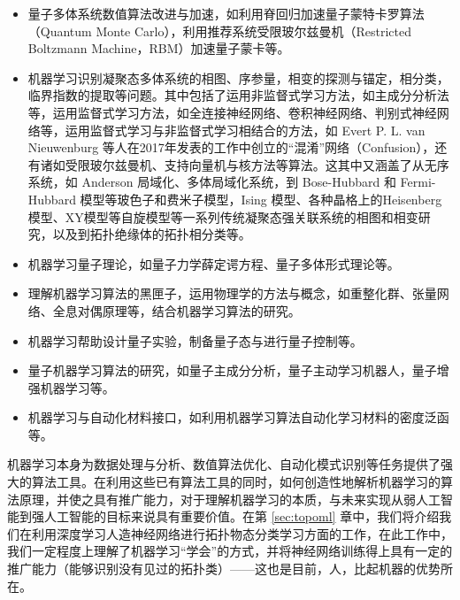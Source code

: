 \begin{itemize}

\item 量子多体系统数值算法改进与加速，如利用脊回归加速量子蒙特卡罗算法（Quantum Monte Carlo）\cite{acmc1,acmc2,acmc3,acmc4}，利用推荐系统受限玻尔兹曼机（Restricted Boltzmann Machine，RBM）加速量子蒙卡\cite{acmcwl1,acmcwl2}等。

\item 机器学习识别凝聚态多体系统的相图、序参量，相变的探测与锚定，相分类，临界指数的提取等问题\cite{ml-anderson-2014,confusion,mlphase2017-nphys,wangleipca2016,wcpca,mlphase2017-prx,jp1,jp2,jp3,jp4,zhangyiml2017,zpf2017,topoml,wanxin-2017,kernel2017,ml-mbl-2017,pca2017a,pca2017b,rbm-2017,unsup-2017,unsup-hubb-2018,discriminative2018,ml-disorder-2018}。其中包括了运用非监督式学习方法\cite{unsup-2017,unsup-hubb-2018}，如主成分分析法\cite{wangleipca2016,wcpca,pca2017a,pca2017b}等，运用监督式学习方法，如全连接神经网络\cite{zhangyiml2017,mlphase2017-prx,ml-mbl-2017}、卷积神经网络\cite{zpf2017,jp1,jp2,jp3,jp4,mlphase2017-nphys,wanxin-2017}、判别式神经网络\cite{discriminative2018}等，运用监督式学习与非监督式学习相结合的方法，如 Evert P. L. van Nieuwenburg 等人在2017年发表的工作\cite{confusion}中创立的“混淆”网络（Confusion），还有诸如受限玻尔兹曼机\cite{rbm-2017}、支持向量机与核方法\cite{kernel2017}等算法。这其中又涵盖了从无序系统\cite{ml-disorder-2018}，如 Anderson 局域化\cite{ml-anderson-2014,jp1,jp2,jp4}、多体局域化\cite{ml-mbl-2017}系统，到 Bose-Hubbard 和 Fermi-Hubbard 模型等玻色子和费米子模型\cite{confusion,rbm-2017,mlphase2017-prx,pca2017b,unsup-hubb-2018}，Ising 模型\cite{jp3,kernel2017,mlphase2017-nphys,wangleipca2016,wcpca,wanxin-2017}、各种晶格上的Heisenberg 模型、XY模型\cite{pca2017a,unsup-2017,wcpca}等自旋模型等一系列传统凝聚态强关联系统的相图和相变研究，以及到拓扑绝缘体的拓扑相分类\cite{zhangyiml2017,zpf2017,jp1,jp2}等。

\item 机器学习量子理论，如量子力学薛定谔方程\cite{dlshrodinger2017,wyd2018}、量子多体形式理论\cite{ml-manybody}等。

\item 理解机器学习算法的黑匣子\cite{mlanalysis2017lin}，运用物理学的方法与概念，如重整化群\cite{dlrg2013,maprgdl2014,rgml2018}、张量网络、全息对偶原理\cite{yyz2018}等，结合机器学习算法的研究。

\item 机器学习帮助设计量子实验\cite{activelearn-exprdesign-2018}，制备量子态与进行量子控制\cite{rein-2018-prx}等。

\item 量子机器学习算法的研究\cite{qml2017,qai2017}，如量子主成分分析\cite{qpca2014}，量子主动学习机器人\cite{active-agent-2014}，量子增强机器学习\cite{qeml}等。

\item 机器学习与自动化材料接口，如利用机器学习算法自动化学习材料的密度泛函\cite{wcyyz}等。

\end{itemize}


机器学习本身为数据处理与分析、数值算法优化、自动化模式识别等任务提供了强大的算法工具。在利用这些已有算法工具的同时，如何创造性地解析机器学习的算法原理，并使之具有推广能力，对于理解机器学习的本质，与未来实现从弱人工智能到强人工智能的目标来说具有重要价值。在第 \ref{sec:topoml} 章中，我们将介绍我们在利用深度学习人造神经网络进行拓扑物态分类学习方面的工作\cite{topoml}，在此工作中，我们一定程度上理解了机器学习“学会”的方式，并将神经网络训练得上具有一定的推广能力（能够识别没有见过的拓扑类）——这也是目前，人，比起机器的优势所在。



